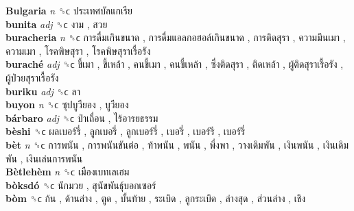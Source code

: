 \textbf{Bulgaria} \emph{n}  ␝ϲ   ประเทศบัลแกเรีย   \\
\textbf{bunita} \emph{adj}  ␝ϲ   งาม ,  สวย   \\
\textbf{buracheria} \emph{n}  ␝ϲ   การดื่มเกินขนาด ,  การดื่มแอลกอฮอล์เกินขนาด ,  การติดสุรา ,  ความมึนเมา ,  ความเมา ,  โรคพิษสุรา ,  โรคพิษสุราเรื้อรัง   \\
\textbf{buraché} \emph{adj}  ␝ϲ   ขี้เมา ,  ขี้เหล้า ,  คนขี้เมา ,  คนขี้เหล้า ,  ซึ่งติดสุรา ,  ติดเหล้า ,  ผู้ติดสุราเรื้อรัง ,  ผู้ป่วยสุราเรื้อรัง   \\
\textbf{buriku} \emph{adj}  ␝ϲ   ลา   \\
\textbf{buyon} \emph{n}  ␝ϲ   ซุปบูวียอง ,  บูวียอง   \\
\textbf{bárbaro} \emph{adj}  ␝ϲ   ป่าเถื่อน ,  ไร้อารยธรรม   \\
\textbf{bèshi} ␝ϲ   ผลเบอร์รี่ ,  ลูกเบอรี่ ,  ลูกเบอร์รี่ ,  เบอรี่ ,  เบอร์รี ,  เบอร์รี่   \\
\textbf{bèt} \emph{n}  ␝ϲ   การพนัน ,  การพนันขันต่อ ,  ท้าพนัน ,  พนัน ,  พึ่งพา ,  วางเดิมพัน ,  เงินพนัน ,  เงินเดิมพัน ,  เงินเล่นการพนัน   \\
\textbf{Bètlehèm} \emph{n}  ␝ϲ   เมืองเบทเลเฮม   \\
\textbf{bòksdó} ␝ϲ   นักมวย ,  สุนัขพันธุ์บอกเซอร์   \\
\textbf{bòm} ␝ϲ   ก้น ,  ด้านล่าง ,  ตูด ,  บั้นท้าย ,  ระเบิด ,  ลูกระเบิด ,  ล่างสุด ,  ส่วนล่าง ,  เชิง   \\

